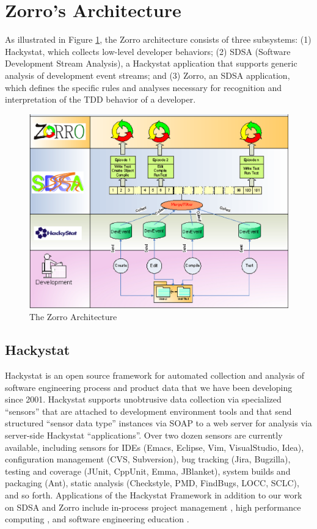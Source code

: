 \documentclass[smallextended]{svjour3}     %
\begin{document}
\section{Zorro's Architecture}
\label{sec:sdsa}

As illustrated in Figure \ref{fig:ZorroArchitecture}, the Zorro
architecture consists of three subsystems: (1) Hackystat, which collects
low-level developer behaviors; (2) SDSA (Software Development Stream
Analysis), a Hackystat application that supports generic analysis of
development event streams; and (3) Zorro, an SDSA application, which
defines the specific rules and analyses necessary for recognition and
interpretation of the TDD behavior of a developer.

\begin{figure}[th]
  \center
  \includegraphics[width=1.0\textwidth]{zorro-architecture.eps}
  \caption{The Zorro Architecture}
  \label{fig:ZorroArchitecture}
\end{figure} 

\subsection{Hackystat}

Hackystat is an open source framework for automated collection and analysis
of software engineering process and product data that we have been
developing since 2001. Hackystat supports unobtrusive data collection via
specialized ``sensors'' that are attached to development environment tools
and that send structured ``sensor data type'' instances via SOAP to a web
server for analysis via server-side Hackystat ``applications''. Over two
dozen sensors are currently available, including sensors for IDEs (Emacs,
Eclipse, Vim, VisualStudio, Idea), configuration management (CVS,
Subversion), bug tracking (Jira, Bugzilla), testing and coverage (JUnit,
CppUnit, Emma, JBlanket), system builds and packaging (Ant), static
analysis (Checkstyle, PMD, FindBugs, LOCC, SCLC), and so forth.
Applications of the Hackystat Framework in addition to our work on SDSA and
Zorro include in-process project management \cite{csdl2-04-11}, high
performance computing \cite{csdl2-04-22}, and software engineering
education \cite{csdl2-03-12}.
\end{document}
